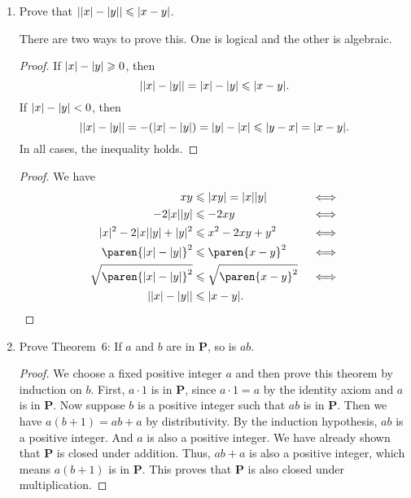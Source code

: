 \documentclass[a4paper]{article}
\begin{document}
\begin{enumerate}
\item Prove that \(\abs*{\abs x - \abs y} \le \abs{x - y}\).

  There are two ways to prove this.  One is logical and the other is
  algebraic.

  \begin{proof}
    If \(\abs x - \abs y \ge 0\), then
    \[
      \abs*{\abs x - \abs y} = \abs x - \abs y \le \abs{x - y}.
    \]
    If \(\lvert x\rvert - \lvert y\rvert < 0\), then
    \[
      \abs*{\abs x - \abs y} = - (\abs x - \abs y) = \abs y - \abs x \le \abs{y - x} = \abs{x - y}.
    \]
    In all cases, the inequality holds.
  \end{proof}

  \begin{proof}
    We have
    \begin{align*}
      xy &\le \abs{xy} = \abs x \abs y         && \iff \\
      -2\abs x\abs y
         &\le -2xy                             && \iff \\
      \abs x^2 - 2\abs x\abs y + \abs y^2
         &\le x^2 - 2xy + y^2                  && \iff \\
      \paren{\abs x - \abs y}^2
         &\le \paren{x - y}^2                  && \iff \\
      \sqrt{\paren{\abs x - \abs y}^2}
         &\le \sqrt{\paren{x - y}^2}           && \iff \\
      \abs*{\abs x - \abs y} &\le \abs{x - y}. && \qedhere
    \end{align*}
  \end{proof}

\item Prove Theorem~6: If \(a\) and \(b\) are in
  \(\mathbf{P}\), so is \(ab\).

  \begin{proof}
    We choose a fixed positive integer \(a\) and then prove this theorem
    by induction on \(b\).  First, \(a \cdot 1\) is in \(\mathbf{P}\),
    since \(a \cdot 1 = a\) by the identity axiom and \(a\) is in
    \(\mathbf{P}\).  Now suppose \(b\) is a positive integer such that
    \(ab\) is in \(\mathbf{P}\).  Then we have \(a(b+1) = ab + a \) by
    distributivity.  By the induction hypothesis, \(ab\) is a positive
    integer.  And \(a\) is also a positive integer.  We have already shown
    that \(\mathbf{P}\) is closed under addition.  Thus, \(ab + a\) is
    also a positive integer, which means \(a(b+1)\) is in \(\mathbf{P}\).
    This proves that \(\mathbf{P}\) is also closed under multiplication.
  \end{proof}


\end{enumerate}
\end{document}
